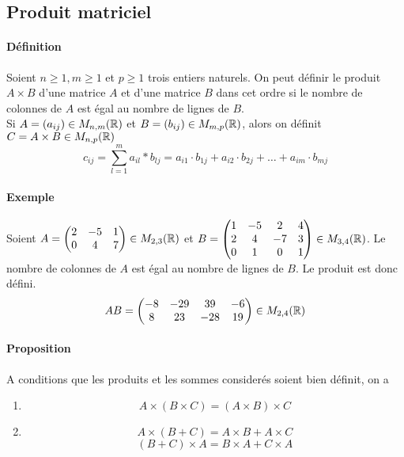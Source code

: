 %
\subsection{Produit matriciel}
%
\paragraph{Définition} Soient $n \geq 1, m \geq 1$ et $p \geq 1$ trois entiers naturels. On peut définir le produit $A \times B$ d'une matrice $A$ et d'une matrice $B$ dans cet ordre si le nombre de colonnes de $A$ est égal au nombre de lignes de $B$. \\
Si $A = (a_{ij}) \in M_{n, m}(\mathbb{R})$ et $B = (b_{ij}) \in M_{m, p}(\mathbb{R})$, alors on définit $C = A \times B \in M_{n, p}(\mathbb{R})$
$$c_{ij} = \sum_{l=1}^{m} a_{il} * b_{lj} = a_{i1} \cdot b_{1j} + a_{i2} \cdot b_{2j} + \ldots + a_{im} \cdot b_{mj}$$

\paragraph{Exemple} Soient $A = 
\begin{pmatrix}
  2 & -5 & 1 \\
  0 & 4 & 7 \\
\end{pmatrix} \in M_{2,3}(\mathbb{R})$ et $B = 
\begin{pmatrix}
  1 & -5 & 2 & 4 \\
  2 & 4 & -7 & 3\\
  0 & 1 & 0 & 1 \\
\end{pmatrix} \in M_{3,4}(\mathbb{R})$. Le nombre de colonnes de $A$ est égal au nombre de lignes de $B$. Le produit est donc défini. 
$$AB = 
\begin{pmatrix}
  -8 & -29 & 39 & -6 \\
  8 & 23 & -28 & 19 \\
\end{pmatrix} \in M_{2,4}(\mathbb{R})$$

\paragraph{Proposition} A conditions que les produits et les sommes considerés soient bien définit, on a
\begin{enumerate}
  \item $$A \times (B \times C) = (A \times B) \times C$$
  \item $$A \times (B + C) = A \times B + A \times C$$ 
    $$(B + C) \times A = B \times A + C \times A$$
\end{enumerate}

